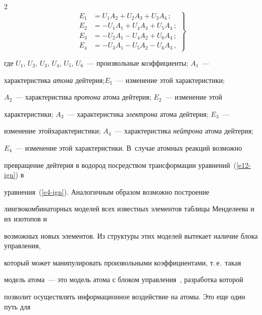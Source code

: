 \begin{multicols}{2}
\begin{equation}
\left.


\begin{array}{rl}


E_1 &= U_1A_2+U_2A_3+U_3A_4\,;\\[6pt]


E_2 &= -U_1A_1+U_4A_3+U_5A_4\,;\\[6pt]


E_3 &= -U_2A_1 -U_4A_2 +U_6A_4\,;\\[6pt]


E_4 &= -U_3A_1-U_5A_2-U_6A_3\,,


\end{array}


\right\}


\label{e12-ign}


\end{equation}


где $U_1$, $U_2$, $U_3$, $U_4$, $U_5$, $U_6$~--- произвольные коэффициенты; $A_1$~--- 


характеристика \textit{атома} дейтерия;\linebreak $E_1$~--- изменение этой характеристики; 


$A_2$~--- характеристика \textit{протона} атома дейтерия; $E_2$~--- изменение этой 


характеристики; $A_3$~--- характеристика \textit{электрона} атома дейтерия; $E_3$~--- 


изменение этой\linebreak характеристики; $A_4$~--- характеристика \textit{нейтрона} атома дейтерия; 


$E_4$~--- изменение этой характеристики. В~случае атомных реакций возможно 


превращение дейтерия в водород посредством трансформации уравнений~(\ref{e12-ign}) в 


уравнения~(\ref{e4-ign}). Аналогичным образом возможно построение 


лингвокомбинаторных моделей всех известных элементов таблицы Менделеева и их изотопов и 


возможных новых элементов. Из структуры этих моделей вытекает наличие блока управ\-ле\-ния, 


который может манипулировать произвольными коэффициентами, т.\,е.\ такая 


модель атома~--- это модель атома с блоком управ\-ле\-ния~\cite{17-ign}, разработка которой 


позволит осуществлять информационное воздействие на атомы. Это еще один путь для 



\end{multicols}
